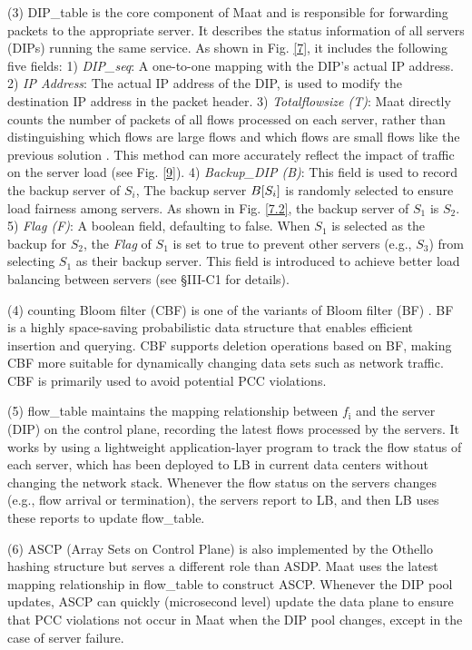 (3) DIP\_table is the core component of Maat and is responsible for forwarding packets to the appropriate server. It describes the status information of all servers (DIPs) running the same service. As shown in Fig. \ref{7}, it includes the following five fields: 1) \emph{DIP_seq}: A one-to-one mapping with the DIP's actual IP address. 2) \emph{IP Address}: The actual IP address of the DIP, is used to modify the destination IP address in the packet header. 3) \emph{Totalflowsize (T)}: Maat directly counts the number of packets of all flows processed on each server, rather than distinguishing which flows are large flows and which flows are small flows like the previous solution \cite{guo2022libra}. This method can more accurately reflect the impact of traffic on the server load (see Fig. \ref{9}). 4) \emph{Backup_DIP (B)}: This field is used to record the backup server of \emph{$S_i$}, The backup server \emph{$B[\emph{$S_i$}]$} is randomly selected to ensure load fairness among servers. As shown in Fig. \ref{7.2}, the backup server of \emph{$S_1$} is \emph{$S_2$}. 5) \emph{Flag (F)}: A boolean field, defaulting to false. When \emph{$S_1$} is selected as the backup for \emph{$S_2$}, the \emph{Flag} of \emph{$S_1$} is set to true to prevent other servers (e.g., \emph{$S_3$}) from selecting \emph{$S_1$} as their backup server. This field is introduced to achieve better load balancing between servers (see \S III-C1 for details).

(4) counting Bloom filter (CBF) is one of the variants of Bloom filter (BF) \cite{geravand2013bloom}. BF is a highly space-saving probabilistic data structure that enables efficient insertion and querying. CBF supports deletion operations based on BF, making CBF more suitable for dynamically changing data sets such as network traffic. CBF is primarily used to avoid potential PCC violations.

(5) flow\_table maintains the mapping relationship between \emph{$f_{\text{i}}$} and the server (DIP) on the control plane, recording the latest flows processed by the servers. It works by using a lightweight application-layer program to track the flow status of each server, which has been deployed to LB \cite{gandhi2014duet} in current data centers without changing the network stack. Whenever the flow status on the servers changes (e.g., flow arrival or termination), the servers report to LB, and then LB uses these reports to update flow\_table.

(6) ASCP (Array Sets on Control Plane) is also implemented by the Othello hashing structure but serves a different role than ASDP. Maat uses the latest mapping relationship in flow\_table to construct ASCP. Whenever the DIP pool updates, ASCP can quickly (microsecond level) update the data plane \cite{shi2020concury} to ensure that PCC violations not occur in Maat when the DIP pool changes, except in the case of server failure.

